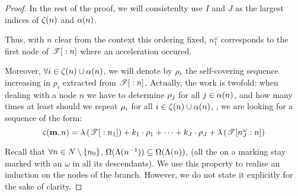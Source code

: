 \begin{proof}
  In the rest of the proof, we will consistenlty use $I$ and $J$ as the largest indices of $\operatorname{\zeta}(n)$ and $\operatorname{\alpha}(n)$.

  Thus, with $n$ clear from the context this ordering fixed, $n^\omega_1$ corresponds to the first node of ${\mathscr{T}}[{}:{n}]$ where an acceleration occured.


  Moreover, $\forall i \in \operatorname{\zeta}(n) \cup \operatorname{\alpha}(n)$, we will denote by $\iscs{i}$ the self-covering sequence increasing in $p_i$ extracted from ${\mathscr{T}}[{}:{n}]$.
  Actually, the work is twofold: when dealing with a node $n$ we have to determine $\iscs{j}$ for all $j \in \operatorname{\alpha}(n)$, and how many times at least should we repeat $\iscs{i}$ for all $i \in \operatorname{\zeta}(n) \cup \operatorname{\alpha}(n)$, , we are looking for a sequence of the form:
  \[ \tts{\mar}{n} = \labt{\treepath{n_1}} + k_1 \cdot \iscs{1} + \dots + k_J \cdot \iscs{J} + \labt{\treepath[n^\omega_J]{n}} \]

  Recall that
  $\forall n \in N \setminus \{n_0\}$, $\operatorname{\Omega}(\operatorname{\Lambda}(n^{-1})) \subseteq \operatorname{\Omega}(\operatorname{\Lambda}(n))$,
  (all the \oplaces on a marking stay marked with an $\omega$ in all its descendants).
  We use this property to realise an induction on the nodes of the branch.
  However, we do not state it explicitly for the sake of clarity.


\end{proof}
